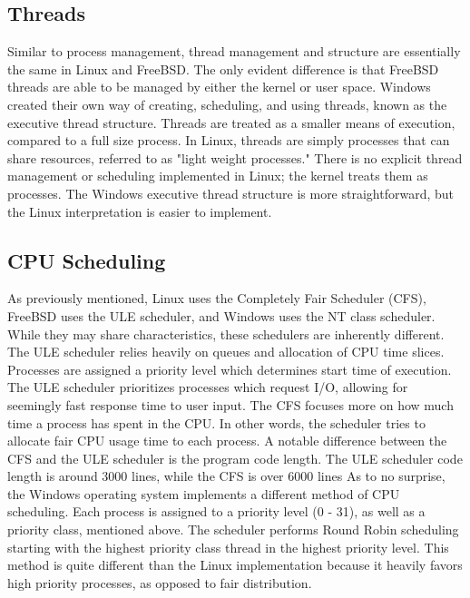 \documentclass[10pt, onecolumn]{IEEEtran}
\begin{document}
    \subsection*{Threads}
        Similar to process management, thread management and structure are essentially the same in Linux and FreeBSD. The only evident difference is that FreeBSD threads are able to be managed by either the kernel or user space. Windows created their own way of creating, scheduling, and using threads, known as the executive thread structure. Threads are treated as a smaller means of execution, compared to a full size process. In Linux, threads are simply processes that can share resources, referred to as "light weight processes." There is no explicit thread management or scheduling implemented in Linux; the kernel treats them as processes. The Windows executive thread structure is more straightforward, but the Linux interpretation is easier to implement.
    
    \vspace{3mm}
    
    \subsection*{CPU Scheduling}
        As previously mentioned, Linux uses the Completely Fair Scheduler (CFS), FreeBSD uses the ULE scheduler, and Windows uses the NT class scheduler. While they may share characteristics, these schedulers are inherently different. The ULE scheduler relies heavily on queues and allocation of CPU time slices. Processes are assigned a priority level which determines start time of execution. The ULE scheduler prioritizes processes which request I/O, allowing for seemingly fast response time to user input. The CFS focuses more on how much time a process has spent in the CPU. In other words, the scheduler tries to allocate fair CPU usage time to each process. A notable difference between the CFS and the ULE scheduler is the program code length. The ULE scheduler code length is around 3000 lines, while the CFS is over 6000 lines
        As to no surprise, the Windows operating system implements a different method of CPU scheduling. Each process is assigned to a priority level (0 - 31), as well as a priority class, mentioned above. The scheduler performs Round Robin scheduling starting with the highest priority class thread in the highest priority level. This method is quite different than the Linux implementation because it heavily favors high priority processes, as opposed to fair distribution.
        
    \newpage
        
    
    
\end{document}
